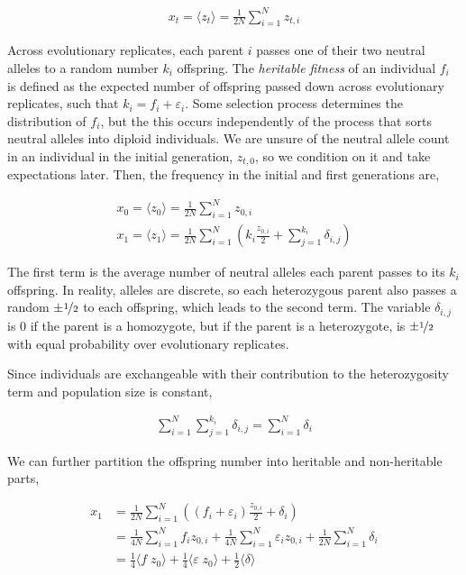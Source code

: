 \documentclass[11pt]{article}
\begin{document}
\begin{align}
  x_t = \langle z_t \rangle = \frac{1}{2N} \sum_{i=1}^N z_{t,i}
\end{align}

Across evolutionary replicates, each parent $i$ passes one of their two neutral
alleles to a random number $k_i$ offspring. The \emph{heritable fitness} of an
individual $f_i$ is defined as the expected number of offspring passed down
across evolutionary replicates, such that $k_i = f_i + \varepsilon_i$.  Some
selection process determines the distribution of $f_i$, but the this occurs
independently of the process that sorts neutral alleles into diploid
individuals. We are unsure of the neutral allele count in an individual in the
initial generation, $z_{t,0}$, so we condition on it and take expectations
later. Then, the frequency in the initial and first generations are,

\begin{align}
  x_0 = \langle z_0 \rangle = \frac{1}{2N} \sum_{i=1}^N z_{0,i} \\
  x_1 = \langle z_1 \rangle = \frac{1}{2N} \sum_{i=1}^N \left( k_i \frac{z_{0,i}}{2} + \sum_{j=1}^{k_i} \delta_{i,j} \right)
\end{align}

The first term is the average number of neutral alleles each parent passes to
its $k_i$ offspring. In reality, alleles are discrete, so each heterozygous
parent also passes a random $\pm \nicefrac{1}{2}$ to each offspring, which
leads to the second term. The variable $\delta_{i,j}$ is 0 if the parent is a
homozygote, but if the parent is a heterozygote, is $\pm \nicefrac{1}{2}$ with
equal probability over evolutionary replicates.

Since individuals are exchangeable with their contribution to the
heterozygosity term and population size is constant,

\begin{align}
  \sum_{i=1}^N \sum_{j=1}^{k_i} \delta_{i,j} = \sum_{i=1}^N \delta_{i} 
\end{align}

We can further partition the offspring number into heritable and non-heritable
parts,

\begin{align}
  x_1 &= \frac{1}{2N} \sum_{i=1}^N \left( (f_i + \varepsilon_i) \frac{z_{0,i}}{2} + \delta_{i} \right) \\
      &= \frac{1}{4N} \sum_{i=1}^N f_i z_{0,i} + \frac{1}{4N} \sum_{i=1}^N \varepsilon_i z_{0,i} + \frac{1}{2N} \sum_{i=1}^N \delta_{i} \\
      &=  \frac{1}{4} \langle f \; z_{0} \rangle + \frac{1}{4} \langle \varepsilon \; z_{0} \rangle + \frac{1}{2}\langle \delta \rangle \\
\end{align}
\end{document}
